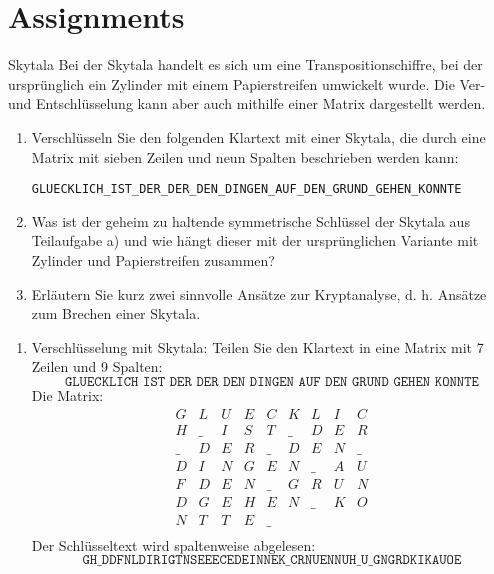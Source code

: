 \documentclass{article}
\author{Leopold Lemmermann}
\begin{document}
\createtitle

\section{Assignments}

\setcounter{subsection}{10}
\begin{exercise}{Skytala}
  Bei der Skytala handelt es sich um eine Transpositionschiffre, bei der ursprünglich ein Zylinder mit einem Papierstreifen umwickelt wurde. Die Ver- und Entschlüsselung kann aber auch mithilfe einer Matrix dargestellt werden.
  \begin{enumerate}
      \item Verschlüsseln Sie den folgenden Klartext mit einer Skytala, die durch eine Matrix mit sieben Zeilen und neun Spalten beschrieben werden kann:
      \begin{center}
          \texttt{GLUECKLICH\_IST\_DER\_DER\_DEN\_DINGEN\_AUF\_DEN\_GRUND\_GEHEN\_KONNTE}
      \end{center}
      \item Was ist der geheim zu haltende symmetrische Schlüssel der Skytala aus Teilaufgabe a) und wie hängt dieser mit der ursprünglichen Variante mit Zylinder und Papierstreifen zusammen?
      \item Erläutern Sie kurz zwei sinnvolle Ansätze zur Kryptanalyse, d. h. Ansätze zum Brechen einer Skytala.
  \end{enumerate}

  \begin{solution}
    \begin{enumerate}
        \item Verschlüsselung mit Skytala: Teilen Sie den Klartext in eine Matrix mit 7 Zeilen und 9 Spalten:
          \[
          \texttt{GLUECKLICH IST DER DER DEN DINGEN AUF DEN GRUND GEHEN KONNTE}
          \]
          Die Matrix:
          \[
          \begin{array}{ccccccccc}
          G & L & U & E & C & K & L & I & C \\
          H & \_ & I & S & T & \_ & D & E & R \\
          \_ & D & E & R & \_ & D & E & N & \_ \\
          D & I & N & G & E & N & \_ & A & U \\
          F & D & E & N & \_ & G & R & U & N \\
          D & G & E & H & E & N & \_ & K & O \\
          N & T & T & E & \_ & & & & \\
          \end{array}
          \]
          Der Schlüsseltext wird spaltenweise abgelesen: 
          \[
          \texttt{GH\_DDFNLDIRIGTNSEEECEDEINNEK\_CRNUENNUH\_U\_GNGRDKIKAUOE}
          \]
  

\end{enumerate}
\end{solution}
\end{exercise}
\end{document}
